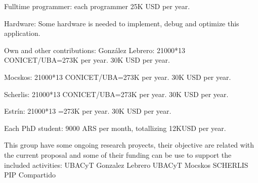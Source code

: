 \documentclass[a4paper,10pt]{article}
\begin{document}
Fulltime programmer: each programmer 25K USD per year.

Hardware: Some hardware is needed to implement, debug and optimize this application.

Own and other contributions:
Gonz\'alez Lebrero: 21000*13 CONICET/UBA=273K per year. 30K USD per year.

Mocskos: 21000*13 CONICET/UBA=273K per year. 30K USD per year.

Scherlis: 21000*13 CONICET/UBA=273K per year. 30K USD per year.

Estr\'in: 21000*13 =273K per year. 30K USD per year.

Each PhD student: 9000 ARS per month, totallizing 12KUSD per year.

This group have some ongoing research proyects, their objective are related with the current proposal and some of their funding can be use to support the included activities:
UBACyT Gonzalez Lebrero
UBACyT Mocskos 
SCHERLIS
PIP Compartido
\end{document}
